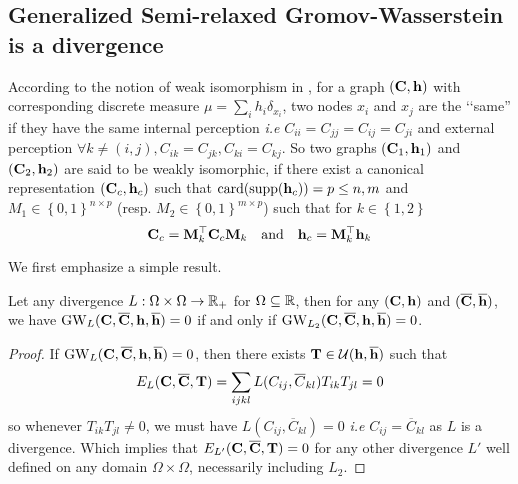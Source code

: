 \subsection{Generalized Semi-relaxed Gromov-Wasserstein is a divergence}\label{sec:srGW_divergence_supp}
\begin{remark}
	According to the notion of weak isomorphism in \citep{chowdhury2019gromov}, for a graph $({\mathbf{C}}, {\mathbf{h}})$ with corresponding discrete measure $\mu = \sum_i h_i \delta_{x_i}$, two nodes $x_i$ and $x_j$ are the ‘‘same'' if they have the same internal perception \emph{i.e} $C_{ii} = C_{jj} = C_{ij} = C_{ji}$ and external perception  $\forall k \neq (i, j), C_{ik} = C_{jk},  C_{ki} = C_{kj}$. So two graphs $({\mathbf{C}}_1, {\mathbf{h}}_1)$ and $({\mathbf{C}}_2, {\mathbf{h}}_2)$ are said to be weakly isomorphic, if there exist a canonical representation $({\mathbf{C}}_c, {\mathbf{h}}_c)$ such that $\operatorname{card}(\operatorname{supp}({\mathbf{h}}_c)) = p \leq n, m$ and $M_1 \in \left\{0,1 \right\}^{n \times p}$ (resp. $M_2 \in \left\{0,1 \right\}^{m \times p}$) such that for $k \in \left\{1, 2\right\}$
	\begin{equation}
		{\mathbf{C}}_c = {\mathbf{M}}_k^\top {\mathbf{C}}_c {\mathbf{M}}_k \quad \text{and} \quad {\mathbf{h}}_c = {\mathbf{M}}_k^\top {\mathbf{h}}_k
	\end{equation}
\end{remark}
We first emphasize a simple result.
\begin{proposition}\label{prop:GW_divergence}
	Let any divergence $L: \Omega \times \Omega \rightarrow \mathbb{R}_+$ for $\Omega \subseteq \mathbb{R}$, then for any $({\mathbf{C}}, {\mathbf{h}})$ and $(\overline{{\mathbf{C}}}, \overline{{\mathbf{h}}})$, we have $\operatorname{GW}_L({\mathbf{C}}, \overline{{\mathbf{C}}}, {\mathbf{h}}, \overline{{\mathbf{h}}}) = 0$ if and only if $\operatorname{GW}_{L_2}({\mathbf{C}}, \overline{{\mathbf{C}}}, {\mathbf{h}}, \overline{{\mathbf{h}}}) = 0$. 
\end{proposition}
\begin{proof}
	If $\operatorname{GW}_L({\mathbf{C}}, \overline{{\mathbf{C}}}, {\mathbf{h}}, \overline{{\mathbf{h}}}) = 0$, then there exists ${\mathbf{T}} \in \mathcal{U}({\mathbf{h}}, \overline{{\mathbf{h}}})$ such that 
	\begin{equation}
		E_L({\mathbf{C}}, \overline{{\mathbf{C}}}, {\mathbf{T}}) = \sum_{ijkl} L(C_{ij}, \overline{C}_{kl})T_{ik}T_{jl} = 0
	\end{equation}
	so whenever $T_{ik}T_{jl} \neq 0$, we must have $L(C_{ij}, \overline{C}_{kl}) = 0$ \emph{i.e} $C_{ij}= \overline{C}_{kl}$ as $L$ is a divergence. Which implies that $E_{L'}({\mathbf{C}}, \overline{{\mathbf{C}}}, {\mathbf{T}}) = 0$ for any other divergence $L'$ well defined on any domain $\Omega \times \Omega$, necessarily including $L_2$.
\end{proof}


